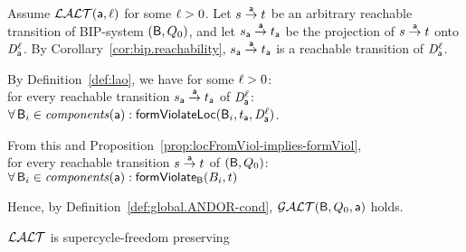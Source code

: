 \bpr
Assume $\LAO(\act, \l)$ for some $\l > 0$. 
%
Let $s \goesto[\act] t$ be an arbitrary reachable transition of BIP-system $(\B, Q_0)$, and let 
$s_\act \goesto[\act] t_\act$ be the projection of $s \goesto[\act] t$ onto $\dsk{\act}{\l}$.
By Corollary~\ref{cor:bip.reachability}, $s_\act \goesto[\act] t_\act$ is a reachable transition of $\dsk{\act}{\l}$.

\noindent
By Definition~\ref{def:lao}, we have for some $\l > 0$:\\
\ind for every reachable transition $s_\act \goesto[\act] t_\act$ of $\dsk{\act}{\l}$:\\
\ind \ind $\fa \B_i \in \cmps{\act} : \locFormViol{\B_i}{t_\act}{\act}{\l}$.

\noindent
From this and Proposition~\ref{prop:locFromViol-implies-formViol},\\
\ind for every reachable transition $s \goesto[\act] t$ of  $(\B, Q_0)$:\\ 
\ind \ind $\fa \B_i \in \cmps{\act} : \formViol{B_i}{t}$

\noindent
Hence, by Definition~\ref{def:global.ANDOR-cond}, $\GAO(\B, Q_0, \act)$ holds.
\epr



\bt \label{thm:LAO.SC-free-preserving}
$\LAO$ is supercycle-freedom preserving
\et
{}



